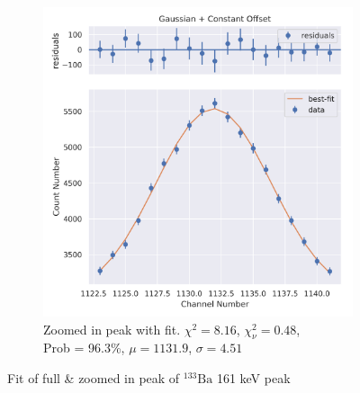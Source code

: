 \documentclass[11pt,a4paper]{article}
\newcommand{\element}[2]{$^{#2}\textrm{#1}$}
\begin{document}
\begin{figure}[H]
\begin{subfigure}{.5\linewidth}
    \includegraphics[width=\linewidth]{./Images/Barium133/Gauss/Gauss_2_Zoom.png}
    \caption{Zoomed in peak with fit. $\chi^2 = 8.16$, $\chi^2_\nu = 0.48$, \\ Prob = 96.3\%, $\mu = 1131.9$, $\sigma = 4.51$}
  \end{subfigure}
  \caption{Fit of full \& zoomed in peak of \element{Ba}{133} 161 keV peak}
\end{figure}
\end{document}
